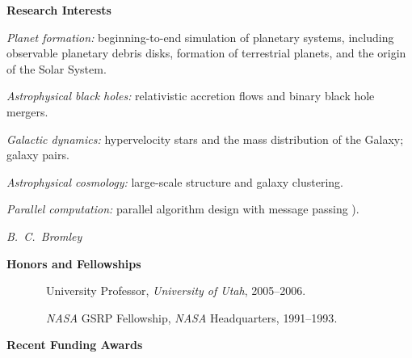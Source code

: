 \documentclass[11pt]{article}
\newcommand{\shead}[1]{\vspace{12.5pt}\centerline{{\bf{#1}}}}
\begin{document}
\vspace{2.75pt}
\shead{Research Interests}

\begin{list}{\mbox{}}{%
\setlength{\partopsep}{0.0in}%
\setlength{\itemindent}{-0.5in}%
\setlength{\leftmargin}{0.7in}%
\setlength{\parsep}{-2.75pt}
}
\vspace{-7.75pt}
\item
{\em Planet formation:}
beginning-to-end simulation of planetary systems,
including observable planetary debris disks, formation of terrestrial
planets, and the origin of the Solar System. 
\item
{\em Astrophysical black holes:}
relativistic accretion flows and
binary black hole mergers.
\item
{\em Galactic dynamics:} 
hypervelocity stars and the mass distribution of the Galaxy;
galaxy pairs.
\item
{\em Astrophysical cosmology:}
large-scale structure and galaxy clustering.
\item
{\em Parallel computation:} parallel algorithm design with message passing
).
\end{list}

\newpage
\mbox{} \hfill {\it B.\ C.\ Bromley}

\vspace{-5.5pt}
\shead{Honors and Fellowships}

\begin{list}{\mbox{}}{%
\setlength{\partopsep}{0.0in}%
\setlength{\itemindent}{-0.5in}%
\setlength{\leftmargin}{1.4in}%
\setlength{\parsep}{-2.75pt}
}
\vspace{-11pt}
\item \mbox{} \ \ \ \ \ \ \ 
University Professor, {\em University of Utah}, 2005--2006.
\item \mbox{} \ \ \ \ \ \ \ 
{\em NASA} GSRP Fellowship, {\em NASA} Headquarters,
{1991--1993}.
\end{list}

\vspace{-13.75pt}

\shead{Recent Funding Awards}
\end{document}
